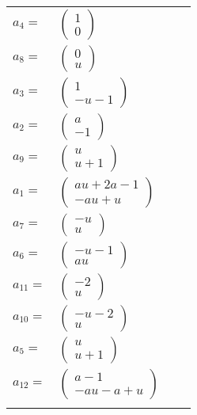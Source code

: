 \documentclass[1p]{elsarticle_modified}
\theoremstyle{definition}
\begin{document}
\begin{tabular}{m{7pt} m{180pt} m{7pt} m{180pt} }
\flushright $a_{4}=$&$\begin{pmatrix}1\\0\end{pmatrix}$ \\
\flushright $a_{8}=$&$\begin{pmatrix}0\\u\end{pmatrix}$ \\
\flushright $a_{3}=$&$\begin{pmatrix}1\\- u-1\end{pmatrix}$ \\
\flushright $a_{2}=$&$\begin{pmatrix}a\\-1\end{pmatrix}$ \\
\flushright $a_{9}=$&$\begin{pmatrix}u\\u+1\end{pmatrix}$ \\
\flushright $a_{1}=$&$\begin{pmatrix}a u+2 a-1\\- a u+u\end{pmatrix}$ \\
\flushright $a_{7}=$&$\begin{pmatrix}- u\\u\end{pmatrix}$ \\
\flushright $a_{6}=$&$\begin{pmatrix}- u-1\\a u\end{pmatrix}$ \\
\flushright $a_{11}=$&$\begin{pmatrix}-2\\u\end{pmatrix}$ \\
\flushright $a_{10}=$&$\begin{pmatrix}- u-2\\u\end{pmatrix}$ \\
\flushright $a_{5}=$&$\begin{pmatrix}u\\u+1\end{pmatrix}$ \\
\flushright $a_{12}=$&$\begin{pmatrix}a-1\\- a u- a+u\end{pmatrix}$\\&\end{tabular}
\end{document}

